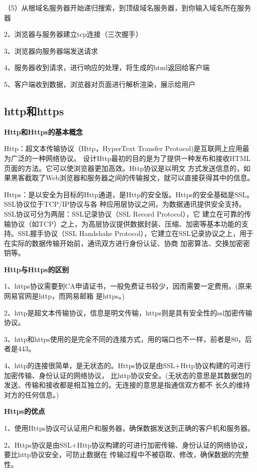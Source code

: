 \documentclass[UTF8]{ctexart}
\begin{document}
（5）从根域名服务器开始递归搜索，到顶级域名服务器，到你输入域名所在服务器

2、浏览器与服务器建立tcp连接（三次握手）

3、浏览器向服务器端发送请求

4、服务器收到请求，进行响应的处理，将生成的html返回给客户端

5、客户端收到数据，浏览器对页面进行解析渲染，展示给用户


\subsection{http和https}

\textbf{Http和Https的基本概念}

Http：超文本传输协议（Http，HyperText Transfer Protocol)是互联网上应用最为广泛的一种网络协议。
设计Http最初的目的是为了提供一种发布和接收HTML页面的方法。它可以使浏览器更加高效。Http协议是以明文
方式发送信息的，如果黑客截取了Web浏览器和服务器之间的传输报文，就可以直接获得其中的信息。

Https：是以安全为目标的Http通道，是Http的安全版。Https的安全基础是SSL。SSL协议位于TCP/IP协议与各
种应用层协议之间，为数据通讯提供安全支持。SSL协议可分为两层：SSL记录协议（SSL Record Protocol），它
建立在可靠的传输协议（如TCP）之上，为高层协议提供数据封装、压缩、加密等基本功能的支持。SSL握手协议（SSL 
Handshake Protocol），它建立在SSL记录协议之上，用于在实际的数据传输开始前，通讯双方进行身份认证、协商
加密算法、交换加密密钥等。

\textbf{Http与Https的区别}

1、https协议需要到CA申请证书，一般免费证书较少，因而需要一定费用。(原来网易官网是http，而网易邮箱
	是https。)

2、http是超文本传输协议，信息是明文传输，https则是具有安全性的ssl加密传输协议。

3、http和https使用的是完全不同的连接方式，用的端口也不一样，前者是80，后者是443。

4、http的连接很简单，是无状态的。Https协议是由SSL+Http协议构建的可进行加密传输、身份认证的网络协议，
比http协议安全。(无状态的意思是其数据包的发送、传输和接收都是相互独立的。无连接的意思是指通信双方都不
	长久的维持对方的任何信息。)

\textbf{Https的优点}

1、使用Https协议可认证用户和服务器，确保数据发送到正确的客户机和服务器。

2、Https协议是由SSL+Http协议构建的可进行加密传输、身份认证的网络协议，要比http协议安全，可防止数据在
传输过程中不被窃取、修改，确保数据的完整性。
\end{document}
